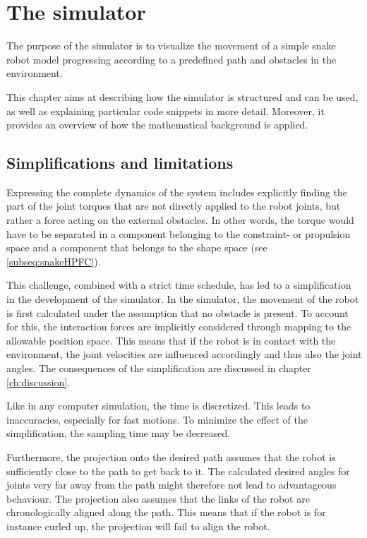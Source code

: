 \chapter{The simulator}\label{ch:simulator}

The purpose of the simulator is to visualize the movement of a simple snake robot model progressing according to a predefined path and obstacles in the environment.

This chapter aims at describing how the simulator is structured and can be used, as well as explaining particular code snippets in more detail. Moreover, it provides an overview of how the mathematical background is applied.

\section{Simplifications and limitations}

Expressing the complete dynamics of the system includes explicitly finding the part of the joint torques that are not directly applied to the robot joints, but rather a force acting on the external obstacles. In other words, the torque would have to be separated in a component belonging to the constraint- or propulsion space and a component that belongs to the shape space (see \ref{subseq:snakeHPFC}).

This challenge, combined with a strict time schedule, has led to a simplification in the development of the simulator. In the simulator, the movement of the robot is first calculated under the assumption that no obstacle is present. To account for this, the interaction forces are implicitly considered through mapping to the allowable position space. This means that if the robot is in contact with the environment, the joint velocities are influenced accordingly and thus also the joint angles. The consequences of the simplification are discussed in chapter \ref{ch:discussion}.

Like in any computer simulation, the time is discretized. This leads to inaccuracies, especially for fast motions. To minimize the effect of the simplification, the sampling time may be decreased. 

Furthermore, the projection onto the desired path assumes that the robot is sufficiently close to the path to get back to it. The calculated desired angles for joints very far away from the path might therefore not lead to advantageous behaviour. The projection also assumes that the links of the robot are chronologically aligned along the path. This means that if the robot is for instance curled up, the projection will fail to align the robot.


